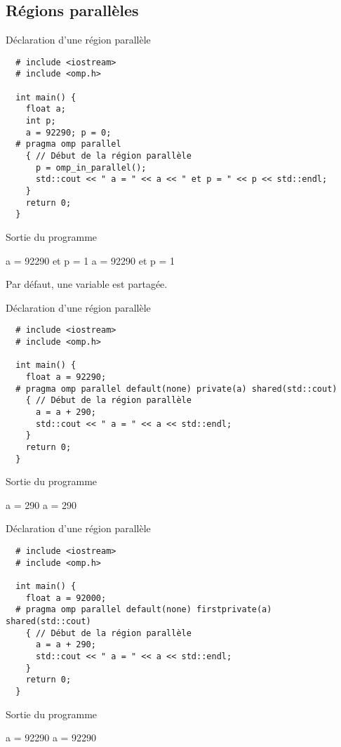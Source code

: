 \documentclass[handout,francais]{beamer}
\begin{document}
\subsection{Régions parallèles}

\begin{frame}[fragile]{Déclaration d'une région parallèle}
 \begin{lstlisting}
  # include <iostream>
  # include <omp.h>
  
  int main() {
    float a;
    int p;
    a = 92290; p = 0;
  # pragma omp parallel
    { // Début de la région parallèle
      p = omp_in_parallel();
      std::cout << " a = " << a << " et p = " << p << std::endl;
    }
    return 0;
  }
 \end{lstlisting}
 
 \begin{block}{Sortie du programme}
  \begin{semiverbatim}
   a = 92290 et p = 1
   a = 92290 et p = 1
  \end{semiverbatim}
  Par défaut, une variable est partagée.
 \end{block} 
\end{frame}

\begin{frame}[fragile]{Déclaration d'une région parallèle}
 \begin{lstlisting}
  # include <iostream>
  # include <omp.h>
  
  int main() {
    float a = 92290;
  # pragma omp parallel default(none) private(a) shared(std::cout)
    { // Début de la région parallèle
      a = a + 290;
      std::cout << " a = " << a << std::endl;
    }
    return 0;
  }
 \end{lstlisting}
 
 \begin{block}{Sortie du programme}
  \begin{semiverbatim}
   a = 290
   a = 290
  \end{semiverbatim}
 \end{block} 
\end{frame}

\begin{frame}[fragile]{Déclaration d'une région parallèle}
 \begin{lstlisting}
  # include <iostream>
  # include <omp.h>
  
  int main() {
    float a = 92000;
  # pragma omp parallel default(none) firstprivate(a) shared(std::cout)
    { // Début de la région parallèle
      a = a + 290;
      std::cout << " a = " << a << std::endl;
    }
    return 0;
  }
 \end{lstlisting}
 
 \begin{block}{Sortie du programme}
  \begin{semiverbatim}
   a = 92290
   a = 92290
  \end{semiverbatim}
 \end{block} 
\end{frame}
\end{document}
